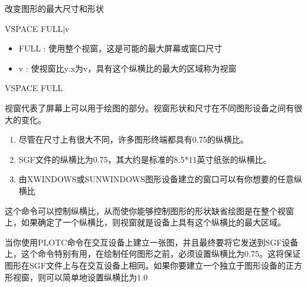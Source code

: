 \label{cmd:vspace}

改变图形的最大尺寸和形状

\begin{SACSTX}
VSPACE FULL|v
\end{SACSTX}

\begin{itemize}
\item FULL : 使用整个视窗，这是可能的最大屏幕或窗口尺寸 
\item v : 使视窗比y:x为v，具有这个纵横比的最大的区域称为视窗 
\end{itemize}

\begin{SACDFT}
VSPACE FULL
\end{SACDFT}

视窗代表了屏幕上可以用于绘图的部分。视窗形状和尺寸在不同图形设备之间有很大的变化。
\begin{enumerate}
\item 尽管在尺寸上有很大不同，许多图形终端都具有0.75的纵横比。
\item SGF文件的纵横比为0.75，其大约是标准的8.5*11英寸纸张的纵横比。
\item  由XWINDOWS或SUNWINDOWS图形设备建立的窗口可以有你想要的任意纵横比
\end{enumerate}

这个命令可以控制纵横比，从而使你能够控制图形的形状缺省绘图是在整个视窗上，如果确定了一个纵横比，则视窗就是设备上具有这个纵横比的最大区域。

当你使用PLOTC命令在交互设备上建立一张图，并且最终要将它发送到SGF设备上，这个命令特别有用，在绘制任何图形之前，必须设置纵横比为0.75。这将保证图形在SGF文件上与在交互设备上相同。如果你要建立一个独立于图形设备的正方形视窗，则可以简单地设置纵横比为1.0
